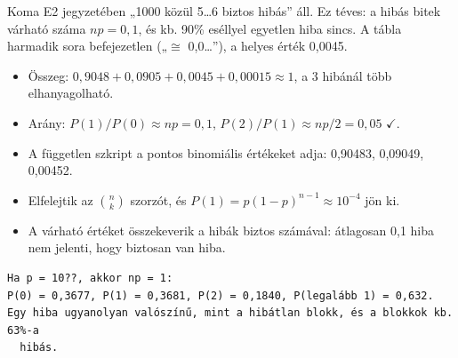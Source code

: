 \begin{center}\end{center}
\begin{figyelem}[Javítás]
Koma E2 jegyzetében „1000 közül 5\ldots{}6 biztos hibás” áll. Ez téves: a hibás bitek várható száma $np=0{,}1$, és kb. 90\% eséllyel egyetlen hiba sincs. A tábla harmadik sora befejezetlen („$\cong$ 0,0\ldots{}”), a helyes érték 0,0045.
\end{figyelem}
\begin{eredmeny}

\begin{center}\end{center}
\end{eredmeny}
\begin{tipp}[Ellenőrzés]
\begin{itemize}
\item Összeg: $0{,}9048+0{,}0905+0{,}0045+0{,}00015\approx1$, a 3 hibánál több elhanyagolható.
\item Arány: $P(1)/P(0)\approx np=0{,}1$, $P(2)/P(1)\approx np/2=0{,}05$ $\checkmark$.
\item A független szkript a pontos binomiális értékeket adja: 0,90483, 0,09049, 0,00452.
\end{itemize}
\end{tipp}
\begin{figyelem}
\begin{itemize}
\item Elfelejtik az $\binom{n}{k}$ szorzót, és $P(1)=p(1-p)^{n-1}\approx 10^{-4}$ jön ki.
\item A várható értéket összekeverik a hibák biztos számával: átlagosan 0,1 hiba nem jelenti, hogy biztosan van hiba.
\end{itemize}
\end{figyelem}
\begin{tipp}
\small
\begin{verbatim}
Ha p = 10??, akkor np = 1:
P(0) = 0,3677, P(1) = 0,3681, P(2) = 0,1840, P(legalább 1) = 0,632.
Egy hiba ugyanolyan valószínű, mint a hibátlan blokk, és a blokkok kb. 63%-a
  hibás.
\end{verbatim}
\end{tipp}
\begin{tipp}

\par{}\par
\end{tipp}


